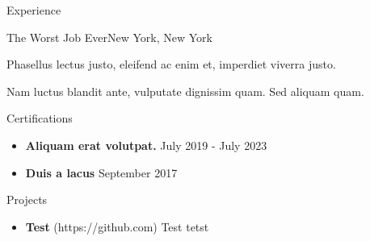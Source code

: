 \documentclass[]{mcdowellcv}
\begin{document}
\begin{cvsection}{Experience}
\begin{jobentry}{The Worst Job Ever}{New York, New York}
        
        \begin{jobresponsibilities}
            \item Phasellus lectus justo, eleifend ac enim et, imperdiet viverra justo.
            \item Nam luctus blandit ante, vulputate dignissim quam. Sed aliquam quam.
        \end{jobresponsibilities}
    \end{jobentry}

\end{cvsection}


\begin{cvsection}{Certifications}
	\begin{cvsubsection}{}{}{}
		\begin{itemize}
			\setlength\itemsep{3pt}
			\item \textbf{Aliquam erat volutpat.} \hfill July 2019 - July 2023
			\item \textbf{Duis a lacus} \hfill September 2017
		\end{itemize}
	\end{cvsubsection}
\end{cvsection}

\begin{cvsection}{Projects}
    \begin{cvsubsection}{}{}{}
        \begin{itemize}
            \setlength\itemsep{3pt}
            \item \textbf{Test} (https://github.com)  Test tetst
        \end{itemize}
    \end{cvsubsection}
\end{cvsection}
\end{document}
